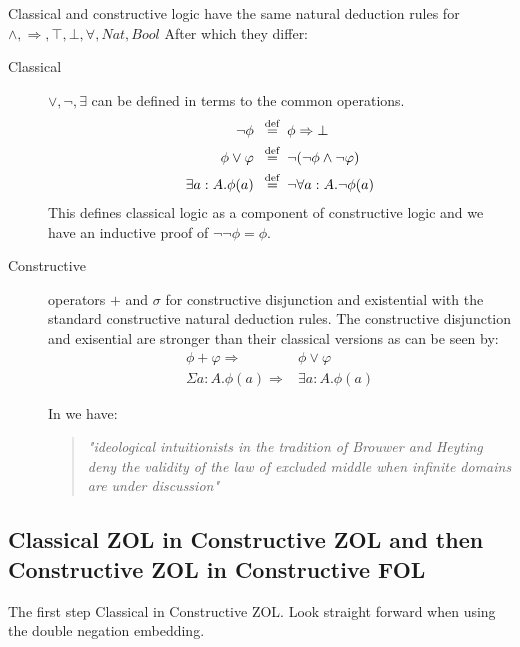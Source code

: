 Classical and constructive logic have the same natural deduction rules for $\land,\Rightarrow,\top,\bot, \forall, Nat,Bool$ After which they differ:
\begin{description}
\item [Classical] $\vee, \neg, \exists$ can be defined in terms to the  common operations.
\begin{align}
\neg \phi   \hspace*{0.5em} \stackrel{\mathrm{def}}{=} \hspace*{0.5em} & \phi \Rightarrow \bot \\
\phi \vee \varphi  \hspace*{0.5em} \stackrel{\mathrm{def}}{=} \hspace*{0.5em} & \neg(\neg \phi \land \neg \varphi) \\
\exists a:A. \phi(a)  \hspace*{0.5em} \stackrel{\mathrm{def}}{=} \hspace*{0.5em} & \neg \forall a:A . \neg \phi(a)
\end{align}
 This defines classical logic as a component of constructive logic and  we have an inductive proof of $\neg\neg \phi = \phi$.

\item [Constructive] operators  $+$ and $\sigma $ for constructive disjunction and existential with the standard constructive natural deduction rules. The constructive disjunction and exisential are stronger than their classical versions as can be seen by:
\begin{align}
\phi + \varphi \Rightarrow & \phi \vee \varphi \\
\Sigma a:A .\phi(a) \Rightarrow & \exists a:A .\phi(a)
\end{align}

In \cite{LMN13} we have:
\begin{quotation}
\emph{"ideological intuitionists in the tradition of Brouwer and Heyting deny the validity of the law of excluded middle when infinite domains are under discussion"}
\end{quotation}

\end{description}


\subsection{Classical ZOL in Constructive ZOL and then  Constructive ZOL in  Constructive FOL}

The first step Classical in Constructive ZOL. Look straight forward when using the double negation embedding.


%
%
%
%

